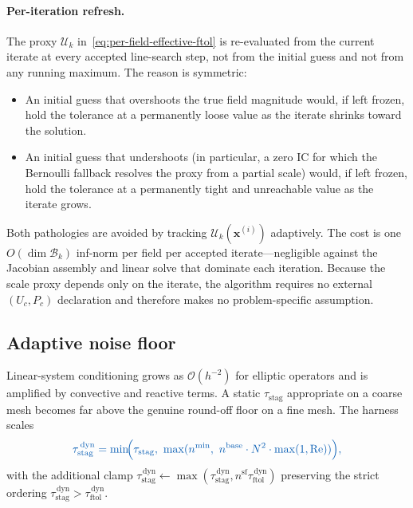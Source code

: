 \documentclass{article}
\newcommand{\textftol}{\tau_{\mathrm{ftol}}}
\newcommand{\textstag}{\tau_{\mathrm{stag}}}
\newcommand{\extline}[1]{{\color{extcolor}#1}}
\begin{document}
\paragraph{Per-iteration refresh.}
\label{sec:harness-perfield-refresh}
\extline{The proxy $\mathcal{U}_{k}$ in~\eqref{eq:per-field-effective-ftol}
is re-evaluated from the current iterate at every accepted
line-search step, not from the initial guess and not from any running
maximum. The reason is symmetric:}
\begin{itemize}[topsep=0pt, itemsep=0pt]
\item \extline{An initial guess that overshoots the true field
magnitude would, if left frozen, hold the tolerance at a permanently
loose value as the iterate shrinks toward the solution.}
\item \extline{An initial guess that undershoots (in particular, a
zero IC for which the Bernoulli fallback resolves the proxy from a
partial scale) would, if left frozen, hold the tolerance at a
permanently tight and unreachable value as the iterate grows.}
\end{itemize}
\extline{Both pathologies are avoided by tracking
$\mathcal{U}_{k}(\boldsymbol{x}^{(i)})$ adaptively. The cost is one
$O(\dim\mathcal{B}_{k})$ inf-norm per field per accepted iterate---negligible against the Jacobian assembly and linear solve that
dominate each iteration. Because the scale proxy depends only on the
iterate, the algorithm requires no external $(U_{c}, P_{c})$
declaration and therefore makes no problem-specific assumption.}

\subsection{Adaptive noise floor}
\label{sec:harness-noise}

\extline{Linear-system conditioning grows as $\mathcal{O}(h^{-2})$ for
elliptic operators and is amplified by convective and reactive terms.
A static $\textstag$ appropriate on a coarse mesh becomes far above
the genuine round-off floor on a fine mesh. The harness scales}
\begin{equation}
    \label{eq:dynamic-noise}
    \textcolor{extcolor}{\textstag^{\,\mathrm{dyn}}
    = \min\!\Bigl(\textstag,\ \max(n^{\min},\ n^{\mathrm{base}} \cdot N^2 \cdot \max(1, \mathrm{Re}))\Bigr),}
\end{equation}
\extline{with the additional clamp
$\textstag^{\,\mathrm{dyn}} \gets \max(\textstag^{\,\mathrm{dyn}}, n^{\mathrm{sf}}\textftol^{\,\mathrm{dyn}})$
preserving the strict ordering
$\textstag^{\,\mathrm{dyn}} > \textftol^{\,\mathrm{dyn}}$.}
\end{document}
